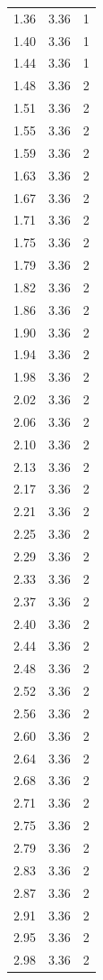 \begin{longtable}{lrr}
  1.36 & 3.36 & 1 \\
  1.40 & 3.36 & 1 \\
  1.44 & 3.36 & 1 \\
  1.48 & 3.36 & 2 \\
  1.51 & 3.36 & 2 \\
  1.55 & 3.36 & 2 \\
  1.59 & 3.36 & 2 \\
  1.63 & 3.36 & 2 \\
  1.67 & 3.36 & 2 \\
  1.71 & 3.36 & 2 \\
  1.75 & 3.36 & 2 \\
  1.79 & 3.36 & 2 \\
  1.82 & 3.36 & 2 \\
  1.86 & 3.36 & 2 \\
  1.90 & 3.36 & 2 \\
  1.94 & 3.36 & 2 \\
  1.98 & 3.36 & 2 \\
  2.02 & 3.36 & 2 \\
  2.06 & 3.36 & 2 \\
  2.10 & 3.36 & 2 \\
  2.13 & 3.36 & 2 \\
  2.17 & 3.36 & 2 \\
  2.21 & 3.36 & 2 \\
  2.25 & 3.36 & 2 \\
  2.29 & 3.36 & 2 \\
  2.33 & 3.36 & 2 \\
  2.37 & 3.36 & 2 \\
  2.40 & 3.36 & 2 \\
  2.44 & 3.36 & 2 \\
  2.48 & 3.36 & 2 \\
  2.52 & 3.36 & 2 \\
  2.56 & 3.36 & 2 \\
  2.60 & 3.36 & 2 \\
  2.64 & 3.36 & 2 \\
  2.68 & 3.36 & 2 \\
  2.71 & 3.36 & 2 \\
  2.75 & 3.36 & 2 \\
  2.79 & 3.36 & 2 \\
  2.83 & 3.36 & 2 \\
  2.87 & 3.36 & 2 \\
  2.91 & 3.36 & 2 \\
  2.95 & 3.36 & 2 \\
  2.98 & 3.36 & 2 \\

\end{longtable}
